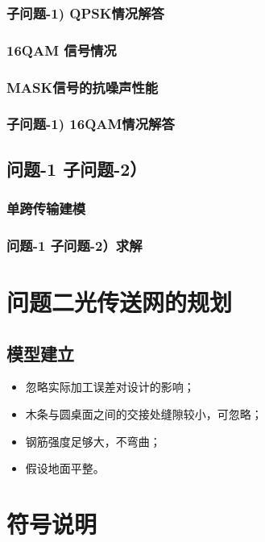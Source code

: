 \documentclass[bwprint]{gmcmthesis}
\numberwithin{equation}{section}
\begin{document}
\subsubsection*{子问题-1) QPSK情况解答}

\subsubsection{16QAM 信号情况}

\subsubsection*{MASK信号的抗噪声性能}

\subsubsection*{子问题-1) 16QAM情况解答}

\subsection{问题-1 子问题-2）}

\subsubsection{单跨传输建模}

\subsubsection{问题-1 子问题-2）求解}

\section{问题二光传送网的规划}

\subsection{模型建立}


\begin{itemize}
\item 忽略实际加工误差对设计的影响；
\item 木条与圆桌面之间的交接处缝隙较小，可忽略；
\item 钢筋强度足够大，不弯曲；
\item 假设地面平整。
\end{itemize}

\section{符号说明}
\end{document}
